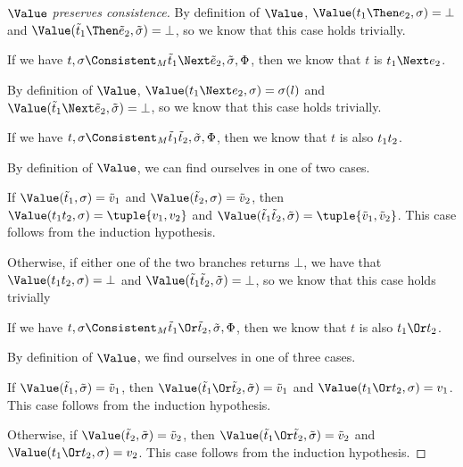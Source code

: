 \begin{proof}[$\Value$ preserves consistence]
{    By definition of $\Value$, $\Value(t_1\Then e_2,\sigma)=\bot$ and $\Value(\tilde{t}_1\Then \tilde{e}_2,\tilde{\sigma})=\bot$, so we know that this case holds trivially.

    }


    {
    If we have $t,\sigma\Consistent_M\tilde{t}_1\Next \tilde{e}_2,\tilde{\sigma},\Phi$, then we know that $t$ is $t_1\Next e_2$.

    By definition of $\Value$, $\Value(t_1\Next e_2,\sigma)=\sigma(l)$ and $\Value(\tilde{t}_1\Next \tilde{e}_2,\tilde{\sigma})=\bot$, so we know that this case holds trivially.

    }

    {
    If we have $t,\sigma\Consistent_M\tilde{t}_1\And \tilde{t}_2,\tilde{\sigma},\Phi$, then we know that $t$ is also $t_1\relax t_2$.

    By definition of $\Value$, we can find ourselves in one of two cases.

    If $\Value(\tilde{t}_1,\sigma)=\tilde{v}_1$ and $\Value(\tilde{t}_2,\sigma)=\tilde{v}_2$,
    then $\Value(t_1\And t_2,\sigma)=\tuple{v_1,v_2}$ and $\Value(\tilde{t}_1\And \tilde{t}_2,\tilde{\sigma})=\tuple{\tilde{v}_1,\tilde{v}_2}$.
    This case follows from the induction hypothesis.

    Otherwise, if either one of the two branches returns $\bot$, we have that
    $\Value(t_1\And t_2,\sigma)=\bot$ and $\Value(\tilde{t}_1\And \tilde{t}_2,\tilde{\sigma})=\bot$,
    so we know that this case holds trivially

    }

    {
    If we have $t,\sigma\Consistent_M\tilde{t}_1\Or \tilde{t}_2,\tilde{\sigma},\Phi$, then we know that $t$ is also $t_1\Or t_2$.

    By definition of $\Value$, we find ourselves in one of three cases.

    If $\Value(\tilde{t}_1,\tilde{\sigma})=\tilde{v}_1$, then $\Value(\tilde{t}_1\Or\tilde{t}_2,\tilde{\sigma})=\tilde{v}_1$
    and $\Value(t_1\Or t_2,\sigma)=v_1$. This case follows from the induction hypothesis.

    Otherwise, if $\Value(\tilde{t}_2,\tilde{\sigma})=\tilde{v}_2$, then $\Value(\tilde{t}_1\Or\tilde{t}_2,\tilde{\sigma})=\tilde{v}_2$
    and $\Value(t_1\Or t_2,\sigma)=v_2$. This case follows from the induction hypothesis.

}
\end{proof}
